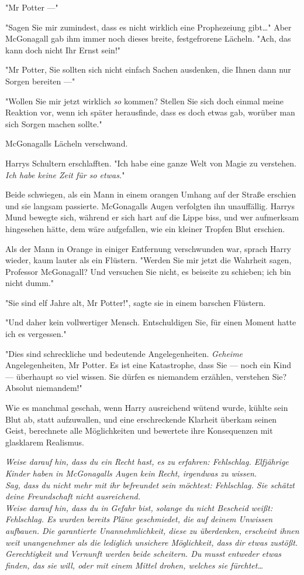{"Mr Potter ---"

"Sagen Sie mir zumindest, dass es nicht wirklich eine Prophezeiung gibt…" Aber McGonagall gab ihm immer noch dieses breite, festgefrorene Lächeln. "Ach, das kann doch nicht Ihr Ernst sein!"

"Mr Potter, Sie sollten sich nicht einfach Sachen ausdenken, die Ihnen dann nur Sorgen bereiten ---"

"Wollen Sie mir jetzt wirklich \emph{so} kommen? Stellen Sie sich doch einmal meine Reaktion vor, wenn ich später herausfinde, dass es doch etwas gab, worüber man sich Sorgen machen sollte."

McGonagalls Lächeln verschwand.

Harrys Schultern erschlafften. "Ich habe eine ganze Welt von Magie zu verstehen. \emph{Ich habe keine Zeit für so etwas.}"

Beide schwiegen, als ein Mann in einem orangen Umhang auf der Straße erschien und sie langsam passierte. McGonagalls Augen verfolgten ihn unauffällig. Harrys Mund bewegte sich, während er sich hart auf die Lippe biss, und wer aufmerksam hingesehen hätte, dem wäre aufgefallen, wie ein kleiner Tropfen Blut erschien.

Als der Mann in Orange in einiger Entfernung verschwunden war, sprach Harry wieder, kaum lauter als ein Flüstern. "Werden Sie mir jetzt die Wahrheit sagen, Professor McGonagall? Und versuchen Sie nicht, es beiseite zu schieben; ich bin nicht dumm."

"Sie sind elf Jahre alt, Mr Potter!", sagte sie in einem barschen Flüstern.

"Und daher kein vollwertiger Mensch. Entschuldigen Sie, für einen Moment hatte ich es vergessen."

"Dies sind schreckliche und bedeutende Angelegenheiten. \emph{Geheime} Angelegenheiten, Mr Potter. Es ist eine Katastrophe, dass Sie --- noch ein Kind --- überhaupt so viel wissen. Sie dürfen es niemandem erzählen, verstehen Sie? Absolut niemandem!"

Wie es manchmal geschah, wenn Harry ausreichend wütend wurde, kühlte sein Blut ab, statt aufzuwallen, und eine erschreckende Klarheit überkam seinen Geist, berechnete alle Möglichkeiten und bewertete ihre Konsequenzen mit glasklarem Realismus.

\emph{Weise darauf hin, dass du ein Recht hast, es zu erfahren: Fehlschlag. Elfjährige Kinder haben in McGonagalls Augen kein Recht, irgendwas zu wissen.\\ Sag, dass du nicht mehr mit ihr befreundet sein möchtest: Fehlschlag. Sie schätzt deine Freundschaft nicht ausreichend.\\ Weise darauf hin, dass du in Gefahr bist, solange du nicht Bescheid weißt: Fehlschlag. Es wurden bereits Pläne geschmiedet, die auf deinem Unwissen aufbauen. Die garantierte Unannehmlichkeit, diese zu überdenken, erscheint ihnen weit unangenehmer als die lediglich unsichere Möglichkeit, dass dir etwas zustößt.\\ Gerechtigkeit und Vernunft werden beide scheitern. Du musst entweder etwas finden, das sie will, oder mit einem Mittel drohen, welches sie fürchtet…}

}
